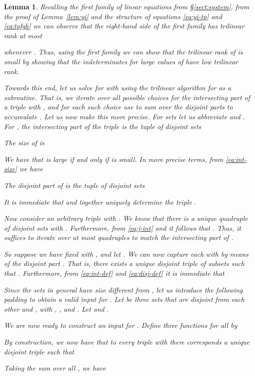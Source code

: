 \documentclass{amsart}
\newtheorem{Lem}{Lemma}
\begin{document}
\begin{Lem}
Recalling the first family of linear equations from \S\ref{sect:system},
from the proof of Lemma~\ref{lem:yi} and the structure of 
equations \eqref{eq:yi-tp} and \eqref{eq:tpfgh} we can observe 
that the right-hand side  of the first family has trilinear
rank at most 

whenever .
Thus, using the first family we can show that the trilinear rank 
of  is small by showing that the indeterminates  for 
large values of  have low trilinear rank.

Towards this end, 
let us solve for  with  using the trilinear algorithm 
for  as a subroutine. 
That is, we iterate over all possible choices
for the intersecting part of a triple  with ,
and for each such choice use  to sum over the disjoint parts 
to accumulate .
Let us now make this more precise.
For sets  let us abbreviate  and
. 
For , the {\em intersecting part}
of the triple  is the tuple
of disjoint sets 

The {\em size} of  is 

We have that  is large if and only if 
 is small. In more precise terms, from \eqref{eq:int-size}
we have

The {\em disjoint part} of  is the tuple 
of disjoint sets

It is immediate that  and  together
uniquely determine the triple .

Now consider an arbitrary triple  with 
. We know that there is a 
unique quadruple  of disjoint sets 
with . Furthermore, from \eqref{eq:j-int}
and  it follows that .
Thus, it suffices to iterate over at most  quadruples 
 to match the intersecting part of .

So suppose we have fixed  with 
, and let .
We can now capture each  with  
by means of the disjoint part . That is, there exists a unique 
disjoint triple  of subsets  
such that .
Furthermore, from \eqref{eq:int-def} and \eqref{eq:disj-def} it is 
immediate that


Since the sets  in general have size different from
, let us introduce the following padding to obtain a valid input
for . Let  be three sets that are disjoint from each
other and , with 
,
, and
.
Let  and .

We are now ready to construct an input for .
Define three functions  for all 
 by 

By construction, we now have that to every triple  with 
 there corresponds a unique disjoint triple 
 such that 

Taking the sum over all , we have


\end{Lem}
\end{document}
